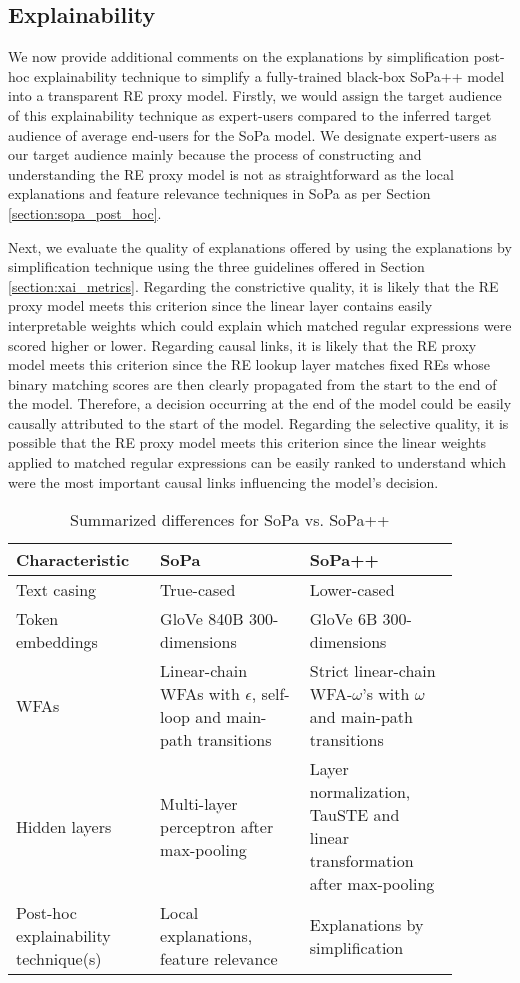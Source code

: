 \subsection{Explainability}

We now provide additional comments on the explanations by simplification
post-hoc explainability technique to simplify a fully-trained black-box SoPa++
model into a transparent RE proxy model. Firstly, we would assign the target
audience of this explainability technique as expert-users compared to the
inferred target audience of average end-users for the SoPa model. We designate
expert-users as our target audience mainly because the process of constructing
and understanding the RE proxy model is not as straightforward as the local
explanations and feature relevance techniques in SoPa as per Section
\ref{section:sopa_post_hoc}.

Next, we evaluate the quality of explanations offered by using the explanations
by simplification technique using the three guidelines offered in Section
\ref{section:xai_metrics}. Regarding the constrictive quality, it is likely that
the RE proxy model meets this criterion since the linear layer contains easily
interpretable weights which could explain which matched regular expressions were
scored higher or lower. Regarding causal links, it is likely that the RE proxy
model meets this criterion since the RE lookup layer matches fixed REs whose
binary matching scores are then clearly propagated from the start to the end of
the model. Therefore, a decision occurring at the end of the model could be
easily causally attributed to the start of the model. Regarding the selective
quality, it is possible that the RE proxy model meets this criterion since the
linear weights applied to matched regular expressions can be easily ranked to
understand which were the most important causal links influencing the model's
decision.

\begin{table}[t!]
  \centering {}
  \begin{tabular}{L{0.275\linewidth} L{0.3\linewidth} L{0.3\linewidth}}
    \toprule
    Characteristic & SoPa & SoPa++ \\
    \midrule
    Text casing & True-cased & Lower-cased \\ 
    Token embeddings & GloVe 840B 300-dimensions & GloVe 6B 300-dimensions \\
    WFAs & Linear-chain WFAs with $\epsilon$, self-loop and main-path transitions & Strict linear-chain WFA-$\omega$'s with $\omega$ and main-path transitions \\
    Hidden layers & Multi-layer perceptron after max-pooling & Layer normalization, TauSTE and linear transformation after max-pooling \\
    Post-hoc explainability technique(s) & Local explanations, feature relevance & Explanations by simplification \\
    \bottomrule
  \end{tabular}
  \caption{Summarized differences for SoPa vs. SoPa++}
  \label{tab:sopa_spp_comparison}
\end{table}

